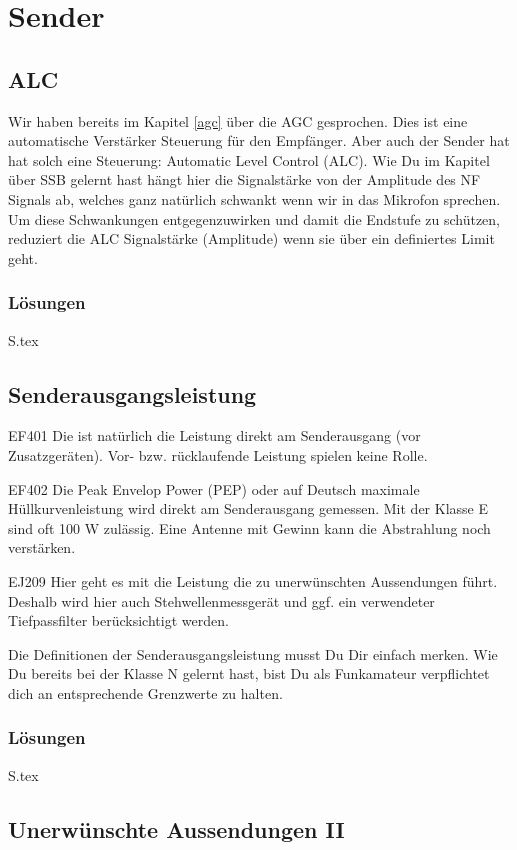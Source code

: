 \documentclass[10pt,a4paper,ngerman]{article}
\theoremstyle{definition}
\theoremstyle{plain}
\theoremstyle{mytheorem}
\theoremstyle{definition}
\newenvironment{ohmchapter}{}
{
  \subsubsection*{Lösungen}
  S\arabic{subsection}.tex}
}
\begin{document}
\section{Sender}
\subsection{ALC}
\begin{ohmchapter}
Wir haben bereits im Kapitel \ref{agc} über die AGC gesprochen. Dies ist eine automatische Verstärker Steuerung für den Empfänger.
Aber auch der Sender hat hat solch eine Steuerung: Automatic Level Control (ALC). Wie Du im Kapitel über SSB gelernt hast hängt hier die Signalstärke von der Amplitude des NF Signals ab, welches ganz natürlich schwankt wenn wir in das Mikrofon sprechen. 
Um diese Schwankungen entgegenzuwirken und damit die Endstufe zu schützen, reduziert die ALC Signalstärke (Amplitude) wenn sie über ein definiertes Limit geht.
\end{ohmchapter}  
\subsection{Senderausgangsleistung}

\begin{sol}{EF401}
Die  ist natürlich die Leistung direkt am Senderausgang (vor Zusatzgeräten). Vor- bzw. rücklaufende Leistung spielen keine Rolle.
\end{sol}  
\begin{sol}{EF402}
Die Peak Envelop Power (PEP) oder auf Deutsch maximale Hüllkurvenleistung wird direkt am Senderausgang gemessen.
Mit der Klasse E sind oft 100 W zulässig. Eine Antenne mit Gewinn kann die Abstrahlung noch verstärken.
\end{sol}  

\begin{sol}{EJ209}
Hier geht es mit die Leistung die zu unerwünschten Aussendungen führt. Deshalb wird hier auch Stehwellenmessgerät und ggf. ein verwendeter Tiefpassfilter berücksichtigt werden.
\end{sol}  


\begin{ohmchapter}
  Die Definitionen der Senderausgangsleistung musst Du Dir einfach merken. Wie Du bereits bei der Klasse N gelernt hast, bist Du als  Funkamateur verpflichtet dich an entsprechende Grenzwerte zu halten.
\end{ohmchapter}

\subsection{Unerwünschte Aussendungen II}
\end{document}
